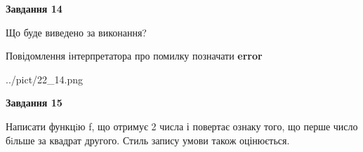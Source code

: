 \documentclass[11pt, ukrainian]{article}
\begin{document}
{\begin {large}
{\begin {center}\textbf{Завдання 14}\end {center}}\par
Що буде виведено за виконання? \par
Повідомлення інтерпретатора про помилку позначати \textbf{error}

\begin{center}
	{../pict/22_14.png}
\end{center}
\newpage

{\begin {center}\textbf{Завдання 15}\end {center}}\par

Написати функцiю f, що отримує 2 числа і повертає ознаку того, що перше число бiльше за квадрат другого. Стиль запису умови також оцінюється.\par
\newpage

\end {large}}
\end{document}
